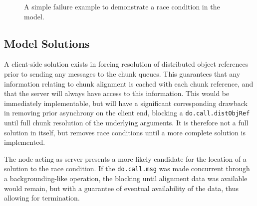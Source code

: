 \documentclass[a4paper,10pt]{article}
\begin{document}
\begin{figure}
	\centering
	\caption{\label{fig:counterex}A simple failure example to demonstrate a race condition in the model.}
\end{figure}

\subsection{Model Solutions}

A client-side solution exists in forcing resolution of distributed object
references prior to sending any messages to the chunk queues.
This guarantees that any information relating to chunk alignment is cached with
each chunk reference, and that the server will always have access to this
information.
This would be immediately implementable, but will have a significant
corresponding drawback in removing prior asynchrony on the client end, blocking
a \lstinline[language=R]{do.call.distObjRef} until full chunk resolution of the
underlying arguments.
It is therefore not a full solution in itself, but removes race conditions
until a more complete solution is implemented.

The node acting as server presents a more likely candidate for the location of
a solution to the race condition.
If the \lstinline[language=R]{do.call.msg} was made concurrent through a
backgrounding-like operation, the blocking until alignment data was available
would remain, but with a guarantee of eventual availability of the data, thus
allowing for termination.
\end{document}

